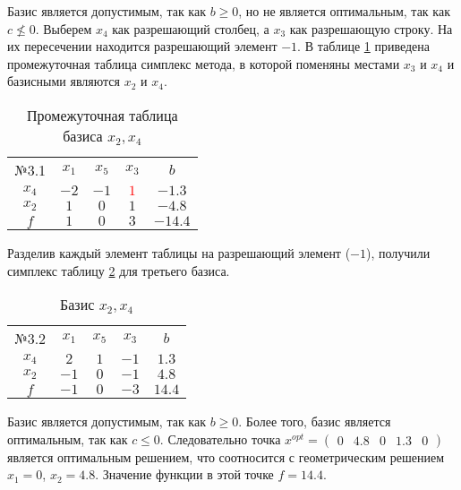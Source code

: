 Базис является допустимым, так как $b \ge 0$, но не является оптимальным, так как $c \nleqslant 0$. Выберем $x_4$ как разрешающий столбец, а $x_3$ как разрешающую строку. На их пересечении находится разрешающий элемент $-1$. В таблице \ref{tab:simplex_4} приведена промежуточная таблица симплекс метода, в которой поменяны местами $x_3$ и $x_4$ и базисными являются $x_2$ и $x_4$.

\begin{table}[H]
\begin{center}
	\def\tabcolsep{15pt}
	\def\arraystretch{1.3}
	\caption{Промежуточная таблица базиса $x_2, x_4$}
	\label{tab:simplex_4}
	\begin{tabular}{|c||c|c|c||c|}
		\hline
		№3.1 & $x_1$ & $x_5$ & $x_3$ & $b$ \\ 
		\hhline{|=#===#=|}
		$x_4$ & $-2$ & $-1$ & \textcolor{red}{\boldmath$1$} & $-1.3$ \\ 
		\hline
		$x_2$ & $1$ & $0$ & $1$ & $-4.8$\\ 
		\hhline{|=#===#=|}
		$f$ & $1$ & $0$ & $3$& $-14.4$ \\ 
		\hline
	\end{tabular}
\end{center}
\end{table}

Разделив каждый элемент таблицы на разрешающий элемент ($-1$), получили симплекс таблицу \ref{tab:simplex_5} для третьего базиса.

\begin{table}[H]
\begin{center}
	\def\tabcolsep{16pt}
	\def\arraystretch{1.3}
	\caption{Базис $x_2, x_4$}
	\label{tab:simplex_5}
	\begin{tabular}{|c||c|c|c||c|}
		\hline
		№3.2 & $x_1$ & $x_5$ & $x_3$ & $b$ \\ 
		\hhline{|=#===#=|}
		$x_4$ & $2$ & $1$ & $-1$ & $1.3$ \\ 
		\hline
		$x_2$ & $-1$ & $0$ & $-1$ & $4.8$\\ 
		\hhline{|=#===#=|}
		$f$ & $-1$ & $0$ & $-3$& $14.4$ \\ 
		\hline
	\end{tabular}
\end{center}
\end{table}

Базис является допустимым, так как $b \ge 0$. Более того, базис является оптимальным, так как $c \le 0$. Следовательно точка $x^{opt} = \begin{pmatrix} 0 & 4.8 & 0 & 1.3 & 0 \end{pmatrix}$ является оптимальным решением, что соотносится с геометрическим решением $x_1 = 0$, $x_2 = 4.8$. Значение функции в этой точке $f = 14.4$.


